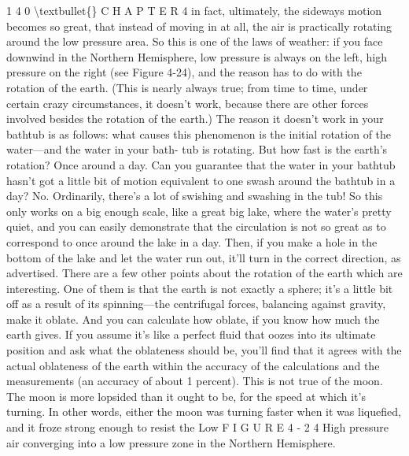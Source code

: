 \documentclass[10pt,oneside]{article}
\begin{document}
1 4 0 \textbackslash{}textbullet\{\} C H A P T E R  4 in fact, ultimately, the sideways motion becomes so great, that instead of moving in at all, the air is practically rotating around the low pressure area. So this is one of the laws of weather: if you face downwind in the Northern Hemisphere, low pressure is always on the left, high pressure on the right (see Figure 4-24), and the reason has to do with the rotation of the earth. (This is nearly always true; from time to time, under certain crazy circumstances, it doesn’t work, because there are other forces involved besides the rotation of the earth.) The reason it doesn’t work in your bathtub is as follows: what causes this phenomenon is the initial rotation of the water---and the water in your bath- tub is rotating. But how fast is the earth’s rotation? Once around a day. Can you guarantee that the water in your bathtub hasn’t got a little bit of motion equivalent to one swash around the bathtub in a day? No. Ordinarily, there’s a lot of swishing and swashing in the tub! So this only works on a big enough scale, like a great big lake, where the water’s pretty quiet, and you can easily demonstrate that the circulation is not so great as to correspond to once around the lake in a day. Then, if you make a hole in the bottom of the lake and let the water run out, it’ll turn in the correct direction, as advertised. There are a few other points about the rotation of the earth which are interesting. One of them is that the earth is not exactly a sphere; it’s a little bit off as a result of its spinning---the centrifugal forces, balancing against gravity, make it oblate. And you can calculate how oblate, if you know how much the earth gives. If you assume it’s like a perfect fluid that oozes into its ultimate position and ask what the oblateness should be, you’ll find that it agrees with the actual oblateness of the earth within the accuracy of the calculations and the measurements (an accuracy of about 1 percent). This is not true of the moon. The moon is more lopsided than it ought to be, for the speed at which it’s turning. In other words, either the moon was turning faster when it was liquefied, and it froze strong enough to resist the Low F I G U R E  4 - 2 4 High pressure air converging into a low pressure zone in the Northern Hemisphere.\par
\end{document}

